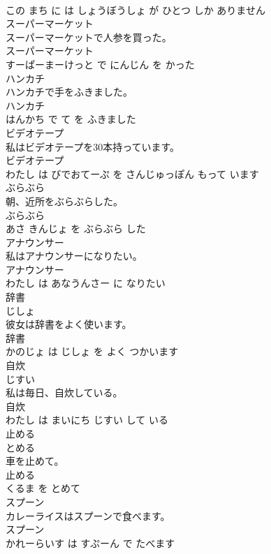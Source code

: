 \documentclass[8pt]{extreport}
\begin{document}
\begin{CJK}{UTF8}{min}
\\	この まち に は しょうぼうしょ が ひとつ しか ありません			
\\	スーパーマーケット	
\\	スーパーマーケットで人参を買った。	
\\	スーパーマーケット 
\\	すーぱーまーけっと で にんじん を かった			
\\	ハンカチ	
\\	ハンカチで手をふきました。	
\\	ハンカチ 
\\	はんかち で て を ふきました			
\\	ビデオテープ	
\\	私はビデオテープを30本持っています。	
\\	ビデオテープ 
\\	わたし は びでおてーぷ を さんじゅっぽん もって います			
\\	ぶらぶら	
\\	朝、近所をぶらぶらした。	
\\	ぶらぶら 
\\	あさ きんじょ を ぶらぶら した			
\\	アナウンサー	
\\	私はアナウンサーになりたい。	
\\	アナウンサー 
\\	わたし は あなうんさー に なりたい			
\\	辞書	
\\	じしょ			
\\	彼女は辞書をよく使います。	
\\	辞書 
\\	かのじょ は じしょ を よく つかいます			
\\	自炊	
\\	じすい			
\\	私は毎日、自炊している。	
\\	自炊 
\\	わたし は まいにち じすい して いる			
\\	止める	
\\	とめる			
\\	車を止めて。	
\\	止める 
\\	くるま を とめて			
\\	スプーン	
\\	カレーライスはスプーンで食べます。	
\\	スプーン 
\\	かれーらいす は すぷーん で たべます			

\end{CJK}
\end{document}
